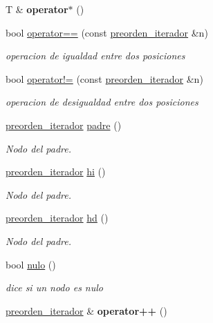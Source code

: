 \begin{DoxyCompactItemize}
\mbox{\label{classArbolBinario_1_1preorden__iterador_ae81ca66951a3fc379f7a80f3a1c3f21c}} 
T \& {\bfseries operator$\ast$} ()
\item 
bool \hyperlink{classArbolBinario_1_1preorden__iterador_abe1fbd66b147f97257a25be21db67b3f}{operator==} (const \hyperlink{classArbolBinario_1_1preorden__iterador}{preorden\+\_\+iterador} \&n)
\begin{DoxyCompactList}\small\item\em operacion de igualdad entre dos posiciones \end{DoxyCompactList}\item 
bool \hyperlink{classArbolBinario_1_1preorden__iterador_a484dec30f4c2c6084cd5bbcefe7ccfa8}{operator!=} (const \hyperlink{classArbolBinario_1_1preorden__iterador}{preorden\+\_\+iterador} \&n)
\begin{DoxyCompactList}\small\item\em operacion de desigualdad entre dos posiciones \end{DoxyCompactList}\item 
\hyperlink{classArbolBinario_1_1preorden__iterador}{preorden\+\_\+iterador} \hyperlink{classArbolBinario_1_1preorden__iterador_ab4313745be1b076ee9ddadead9a9f31c}{padre} ()
\begin{DoxyCompactList}\small\item\em Nodo del padre. \end{DoxyCompactList}\item 
\hyperlink{classArbolBinario_1_1preorden__iterador}{preorden\+\_\+iterador} \hyperlink{classArbolBinario_1_1preorden__iterador_ab5544b595b19971dd01fea9db98de720}{hi} ()
\begin{DoxyCompactList}\small\item\em Nodo del padre. \end{DoxyCompactList}\item 
\hyperlink{classArbolBinario_1_1preorden__iterador}{preorden\+\_\+iterador} \hyperlink{classArbolBinario_1_1preorden__iterador_a3bae3e50aa8ee51f6cf862efa9f56270}{hd} ()
\begin{DoxyCompactList}\small\item\em Nodo del padre. \end{DoxyCompactList}\item 
bool \hyperlink{classArbolBinario_1_1preorden__iterador_afd2b641bb148fddafb617ea0af3e174c}{nulo} ()
\begin{DoxyCompactList}\small\item\em dice si un nodo es nulo \end{DoxyCompactList}\item 
\mbox{\label{classArbolBinario_1_1preorden__iterador_a2fcfef237d6d68e4685c00a0f6ba6576}} 
\hyperlink{classArbolBinario_1_1preorden__iterador}{preorden\+\_\+iterador} \& {\bfseries operator++} ()
\end{DoxyCompactItemize}
